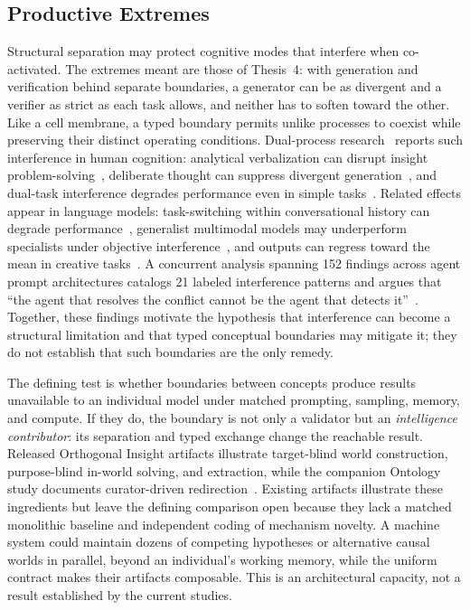 \documentclass[11pt]{article}
\begin{document}
\subsection{Productive Extremes}
\label{sec:synergy}

Structural separation may protect cognitive modes that interfere when co-activated. The extremes meant are those of Thesis~4: with generation and verification behind separate boundaries, a generator can be as divergent and a verifier as strict as each task allows, and neither has to soften toward the other. Like a cell membrane, a typed boundary permits unlike processes to coexist while preserving their distinct operating conditions. Dual-process research~\cite{kahneman2011,stanovich2000,evans2008dual} reports such interference in human cognition: analytical verbalization can disrupt insight problem-solving~\cite{schooler1993}, deliberate thought can suppress divergent generation~\cite{dijksterhuis2006}, and dual-task interference degrades performance even in simple tasks~\cite{pashler1994}. Related effects appear in language models: task-switching within conversational history can degrade performance~\cite{Gupta2024interference}, generalist multimodal models may underperform specialists under objective interference~\cite{MoME2024}, and outputs can regress toward the mean in creative tasks~\cite{GaltonMedian2025}. A concurrent analysis spanning 152 findings across agent prompt architectures catalogs 21 labeled interference patterns and argues that ``the agent that resolves the conflict cannot be the agent that detects it''~\cite{Arbiter2026}. Together, these findings motivate the hypothesis that interference can become a structural limitation and that typed conceptual boundaries may mitigate it; they do not establish that such boundaries are the only remedy.

The defining test is whether boundaries between concepts produce results unavailable to an individual model under matched prompting, sampling, memory, and compute. If they do, the boundary is not only a validator but an \emph{intelligence contributor}: its separation and typed exchange change the reachable result. Released Orthogonal Insight artifacts illustrate target-blind world construction, purpose-blind in-world solving, and extraction, while the companion Ontology study documents curator-driven redirection~\cite{westerberg2025strangeworlds,westerberg2026ontology}. Existing artifacts illustrate these ingredients but leave the defining comparison open because they lack a matched monolithic baseline and independent coding of mechanism novelty. A machine system could maintain dozens of competing hypotheses or alternative causal worlds in parallel, beyond an individual's working memory, while the uniform contract makes their artifacts composable. This is an architectural capacity, not a result established by the current studies.
\end{document}
